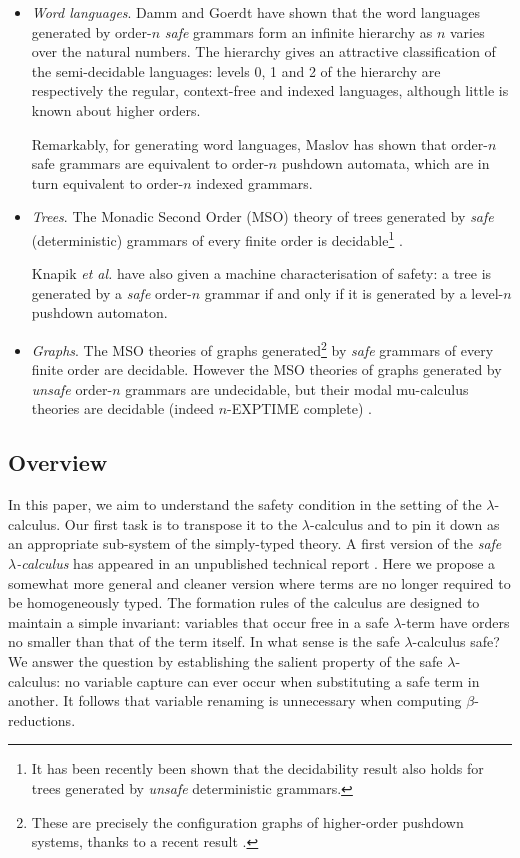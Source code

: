 \documentclass{llncs}
\begin{document}
\begin{itemize}
\item \emph{Word languages}. Damm and Goerdt \cite{DG86} have shown
  that the word languages generated by order-$n$ \emph{safe} grammars
  form an infinite hierarchy as $n$ varies over the natural numbers.
  The hierarchy gives an attractive classification of the
  semi-decidable languages: levels 0, 1 and 2 of the hierarchy are
  respectively the regular, context-free and indexed languages,
  although little is known about higher orders.

  Remarkably, for generating word languages, Maslov \cite{Mas74,Mas76}
  has shown that order-$n$ safe grammars are equivalent to order-$n$
  pushdown automata, which are in turn equivalent to order-$n$ indexed
  grammars.

\item \emph{Trees}. The Monadic Second Order (MSO) theory of trees
  generated by \emph{safe} (deterministic) grammars of every finite
  order is decidable\footnote{It has been recently been shown
    \cite{OngLics2006} that the decidability result also holds for
    trees generated by \emph{unsafe} deterministic grammars.}
  \cite{KNU02}.

  Knapik \emph{et al.} have also given a machine characterisation of
  safety: a tree is generated by a \emph{safe} order-$n$ grammar if
  and only if it is generated by a level-$n$ pushdown automaton.

\item \emph{Graphs}. The MSO theories of graphs
  generated\footnote{These are precisely the configuration graphs of
    higher-order pushdown systems, thanks to a recent result
    \cite[Theorem 4]{hague-sto07}.} by \emph{safe} grammars of every
  finite order are decidable. However the MSO theories of graphs
  generated by \emph{unsafe} order-$n$ grammars are undecidable,
  but their modal mu-calculus theories are decidable (indeed
  $n$-EXPTIME complete) \cite{hague-sto07}.
\end{itemize}

\subsection*{Overview}

In this paper, we aim to understand the safety condition in the
setting of the $\lambda$-calculus. Our first task is to transpose it
to the $\lambda$-calculus and to pin it down as an appropriate
sub-system of the simply-typed theory. A first version of the
\emph{safe $\lambda$-calculus} has appeared in an unpublished
technical report \cite{safety-mirlong2004}. Here we propose a somewhat
more general and cleaner version where terms are no longer required to
be homogeneously typed. The formation rules of the calculus are
designed to maintain a simple invariant: variables that occur free in
a safe $\lambda$-term have orders no smaller than that of the term
itself.  In what sense is the safe $\lambda$-calculus safe? We answer
the question by establishing the salient property of the safe
$\lambda$-calculus: no variable capture can ever occur when
substituting a safe term in another. It follows that variable renaming
is unnecessary when computing $\beta$-reductions.
\end{document}
